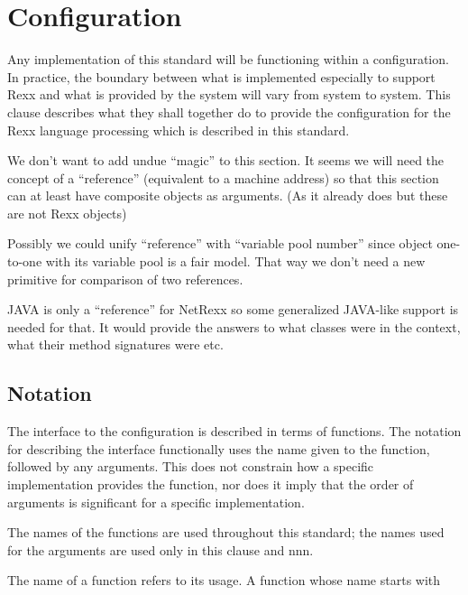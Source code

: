 \hypertarget{configuration}{%
\chapter{Configuration}\label{configuration}}

Any implementation of this standard will be functioning within a
configuration. In practice, the boundary between what is implemented
especially to support Rexx and what is provided by the system will vary
from system to system. This clause describes what they shall together do
to provide the configuration for the Rexx language processing which is
described in this standard.

We don't want to add undue ``magic'' to this section. It seems we will
need the concept of a ``reference'' (equivalent to a machine address) so
that this section can at least have composite objects as arguments. (As
it already does but these are not Rexx objects)

Possibly we could unify ``reference'' with ``variable pool number''
since object one-to-one with its variable pool is a fair model. That way
we don't need a new primitive for comparison of two references.

JAVA is only a ``reference'' for NetRexx so some generalized JAVA-like
support is needed for that. It would provide the answers to what classes
were in the context, what their method signatures were etc.

\hypertarget{notation}{%
\section{Notation}\label{notation}}

The interface to the configuration is described in terms of functions.
The notation for describing the interface functionally uses the name
given to the function, followed by any arguments. This does not
constrain how a specific implementation provides the function, nor does
it imply that the order of arguments is significant for a specific
implementation.

The names of the functions are used throughout this standard; the names
used for the arguments are used only in this clause and nnn.

The name of a function refers to its usage. A function whose name starts
with

